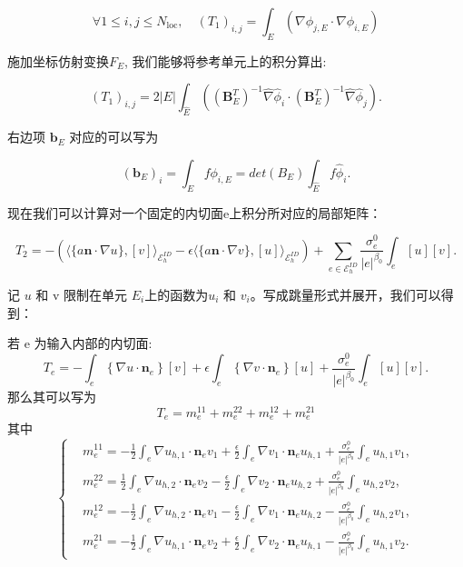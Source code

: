 $$\forall 1 \leq i, j \leq N_{\mathrm{loc}}, \quad\left(T_1\right)_{i, j}=\int_{E}\left( \nabla \phi_{j, E} \cdot \nabla \phi_{i, E}\right)$$

施加坐标仿射变换$F_{E}$, 我们能够将参考单元上的积分算出:

$$\left(T_1\right)_{i, j}=2|E| \int_{\hat{E}}\left(\left(\boldsymbol{B}_{E}^{T}\right)^{-1} \hat{\nabla} \hat{\phi}_{i} \cdot\left(\boldsymbol{B}_{E}^{T}\right)^{-1} \hat{\nabla} \hat{\phi}_{j}\right) .$$

右边项 $ \boldsymbol{b}_{E}$ 对应的可以写为

$$\left(\boldsymbol{b}_{E}\right)_{i}=\int_{E} f \phi_{i, E} = det(B_E)\int_{\hat{E}} f \hat{\phi}_i.$$

现在我们可以计算对一个固定的内切面e上积分所对应的局部矩阵：

$$T_2= -\left(\langle\{a\textbf{n}\cdot \nabla u \},[v]\rangle_{\mathcal{E}_{h}^{I D}}-\epsilon\langle\{a \textbf{n}\cdot\nabla v \}, [u]\rangle_{\mathcal{E}_{h}^{I D}}\right)+\sum_{e \in \mathcal{E}_{h}^{I D}}\frac{\sigma_{e}^{0}}{|e|^{\beta_{0}}} \int_{e}\left[u\right][v] .$$

记 $u$ 和  v  限制在单元  $E_{i}$上的函数为$u_{i}$ 和 $ v_{i}$。写成跳量形式并展开，我们可以得到：

若 e 为输入内部的内切面:
$$T_e=-\int_{e}\left\{ \nabla u \cdot \boldsymbol{n}_{e}\right\}[v]+\epsilon \int_{e}\left\{ \nabla v \cdot \boldsymbol{n}_{e}\right\}\left[u\right]+\frac{\sigma_{e}^{0}}{|e|^{\beta_{0}}} \int_{e}\left[u\right][v] .$$
那么其可以写为
$$T_e=m_{e}^{11}+m_{e}^{22}+m_{e}^{12}+m_{e}^{21}$$ 其中
$$\left\{
\begin{aligned}
    &m_{e}^{11}=-\frac{1}{2} \int_{e}  \nabla u_{h, 1} \cdot \boldsymbol{n}_{e} v_{1}+\frac{\epsilon}{2} \int_{e}  \nabla v_{1} \cdot \boldsymbol{n}_{e} u_{h, 1}+\frac{\sigma_{e}^{0}}{|e|^{\beta_{0}}} \int_{e} u_{h, 1} v_{1}, \\
    &m_{e}^{22}=\frac{1}{2} \int_{e}  \nabla u_{h, 2} \cdot \boldsymbol{n}_{e} v_{2}-\frac{\epsilon}{2} \int_{e}  \nabla v_{2} \cdot \boldsymbol{n}_{e} u_{h, 2}+\frac{\sigma_{e}^{0}}{|e|^{\beta_{0}}} \int_{e} u_{h, 2} v_{2}, \\
    &m_{e}^{12}=-\frac{1}{2} \int_{e}  \nabla u_{h, 2} \cdot \boldsymbol{n}_{e} v_{1}-\frac{\epsilon}{2} \int_{e}  \nabla v_{1} \cdot \boldsymbol{n}_{e} u_{h, 2}-\frac{\sigma_{e}^{0}}{|e|^{\beta_{0}}} \int_{e} u_{h, 2} v_{1}, \\
    &m_{e}^{21}=-\frac{1}{2} \int_{e}  \nabla u_{h, 1} \cdot \boldsymbol{n}_{e} v_{2}+\frac{\epsilon}{2} \int_{e}  \nabla v_{2} \cdot \boldsymbol{n}_{e} u_{h, 1}-\frac{\sigma_{e}^{0}}{|e|^{\beta_{0}}} \int_{e} u_{h, 1} v_{2} .
\end{aligned}\right.$$


